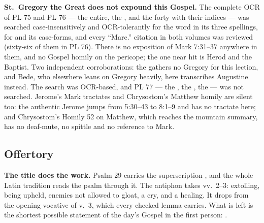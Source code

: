 \textbf{St.~Gregory the Great does not expound this Gospel.} The complete OCR
of PL 75 and PL 76 --- the  entire, the , and the forty  with their indices ---
was searched case-insensitively and OCR-tolerantly for the word in its three
spellings, for  and its case-forms, and every ``Marc.''
citation in both volumes was reviewed (sixty-six of them in PL 76). There is no
exposition of Mark 7:31--37 anywhere in them, and no Gospel homily on the
pericope; the
one near hit is Herod and the Baptist. Two independent corroborations: the
 gathers no Gregory for this lection, and Bede, who
elsewhere leans on Gregory heavily, here transcribes Augustine instead.
The search was OCR-based, and PL 77 --- the , the , the  --- was not searched.
Jerome's Mark tractates and Chrysostom's Matthew homily are silent too: the
authentic Jerome  jumps from 5:30--43 to 8:1--9 and has no tractate here; and
Chrysostom's Homily 52 on Matthew, which reaches the mountain summary, has no
deaf-mute, no spittle and no reference to Mark.

\elementguard
\subsection*{Offertory }


\textbf{The title does the work.} Psalm 29 carries the superscription
, and the whole Latin
tradition reads the psalm through it. The antiphon takes vv.~2--3: extolling,
being upheld, enemies not allowed to gloat, a cry, and a healing. It drops
 from the opening vocative of v.~3, which every checked lemma
carries. What is left is the shortest possible statement of the day's Gospel in
the first person: .

